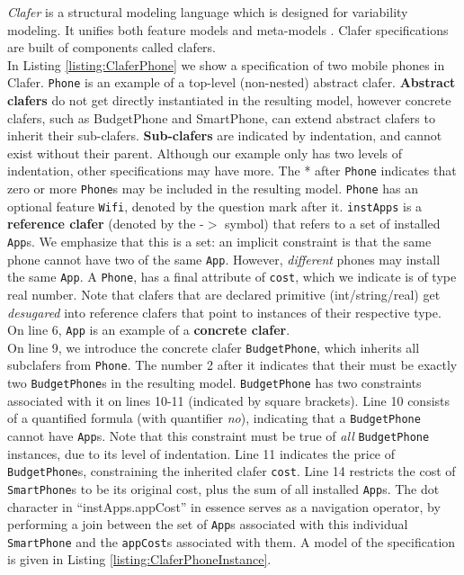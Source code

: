 \documentclass{easychair}
\newcommand{\eg}{\emph{e.g.}\xspace}
\begin{document}
\emph{Clafer} is a structural modeling language which is designed for variability modeling. It unifies both feature models  and meta-models \cite{BakClafer}. Clafer specifications are built of components called clafers. \\
%
\indent In Listing \ref{listing:ClaferPhone}  we show a specification of two mobile phones in Clafer. 
%
 \texttt{Phone} is an example of a top-level (non-nested) abstract clafer. \textbf{Abstract clafers} do not get directly instantiated in the resulting model, however concrete clafers, such as BudgetPhone and SmartPhone, can extend abstract clafers to inherit their sub-clafers. \textbf{Sub-clafers} are indicated by indentation, and cannot exist without their parent. Although our example only has two levels of indentation, other specifications may have more. The * after \texttt{Phone} indicates that zero or more \texttt{Phone}s may be included in the resulting model. \texttt{Phone} has an optional feature \texttt{Wifi}, denoted by the question mark after it. \texttt{instApps} is a \textbf{reference clafer} (denoted by the  -$>$ symbol) that refers  to a set of installed \texttt{App}s. We emphasize that this is a set: an implicit constraint is that the same phone cannot have two of the same \texttt{App}. However, \textit{different} phones may install the same \texttt{App}. A \texttt{Phone}, has a final attribute of \texttt{cost}, which we indicate is of type real number. Note that clafers that are declared primitive (int/string/real) get \textit{desugared} into reference clafers that point to instances of their respective type. On line 6,  \texttt{App}  is an example of a \textbf{concrete clafer}.\\
%
\indent On line 9, we introduce the concrete clafer \texttt{BudgetPhone}, which inherits all subclafers from \texttt{Phone}. The number 2 after it indicates that their must be exactly two \texttt{BudgetPhone}s in the resulting model. \texttt{BudgetPhone} has two constraints associated with it on lines 10-11 (indicated by square brackets). Line 10 consists of a quantified formula (with quantifier \textit{no}), indicating that a \texttt{BudgetPhone} cannot have \texttt{App}s. Note that this constraint must be true of \textit{all} \texttt{BudgetPhone} instances, due to its level of indentation. Line 11 indicates the price of \texttt{BudgetPhone}s, constraining the inherited clafer \texttt{cost}. Line 14 restricts the cost of \texttt{SmartPhone}s to be its original cost, plus the sum of all installed \texttt{App}s. The dot character in ``instApps.appCost''  in essence serves as a navigation operator, by performing a join between the set of \texttt{App}s associated with this individual \texttt{SmartPhone} and the \texttt{appCost}s associated with them. A model of the specification is given in Listing \ref{listing:ClaferPhoneInstance}.\\ %
\end{document}
